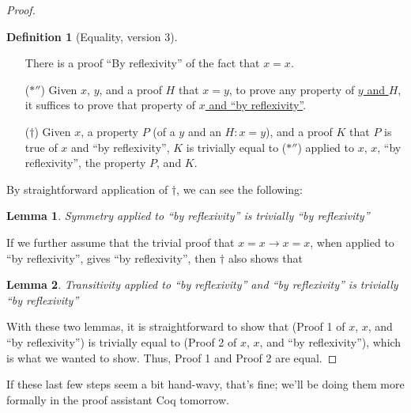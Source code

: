 \documentclass{article}
\newtheorem*{lem*}{Lemma}
\theoremstyle{definition}
\newtheorem*{defn*}{Definition}
\begin{document}
\begin{proof}
{\setlength{\parskip}{0pt}%
\begin{defn*}[Equality, version 3]
$\left.\right.$\\
\begin{enumerate}
\item[] There is a proof ``By reflexivity'' of the fact that $x = x$.
\item[($\ast''$)] Given $x$, $y$, and a proof \underline{$H$} that $x = y$, to prove any property of \underline{$y$ and $H$}, it suffices to prove that property of \underline{$x$ and ``by reflexivity''}.
\item[($\dagger$)] Given $x$, a property $P$ (of a $y$ and an $H : x = y$), and a proof $K$ that $P$ is true of $x$ and ``by reflexivity'', $K$ is trivially equal to ($\ast''$) applied to $x$, $x$, ``by reflexivity'', the property $P$, and $K$.
\end{enumerate}
\end{defn*}
}

By straightforward application of $\dagger$, we can see the following:
\begin{lem*}
Symmetry applied to ``by reflexivity'' is trivially ``by reflexivity''
\end{lem*}

If we further assume that the trivial proof that $x = x \to x = x$, when applied to ``by reflexivity'', gives ``by reflexivity'', then $\dagger$ also shows that
\begin{lem*}
Transitivity applied to ``by reflexivity'' and ``by reflexivity'' is trivially ``by reflexivity''
\end{lem*}

With these two lemmas, it is straightforward to show that (Proof 1 of $x$, $x$, and ``by reflexivity'') is trivially equal to (Proof 2 of $x$, $x$, and ``by reflexivity''), which is what we wanted to show.  Thus, Proof 1 and Proof 2 are equal.
\end{proof}

If these last few steps seem a bit hand-wavy, that's fine; we'll be doing them more formally in the proof assistant Coq tomorrow.
\end{document}
